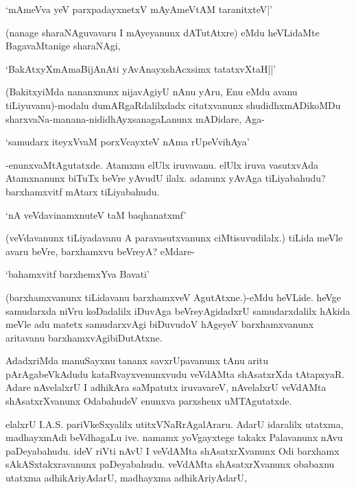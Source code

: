 \begin{shloka}
`mAmeVva yeV parxpadayxnetxV mAyAmeVtAM taranitxteV|'
\end{shloka}

(nanage sharaNAguvavaru I mAyeyanunx dATutAtxre) eMdu heVLidaMte BagavaMtanige sharaNAgi,

\begin{shloka}
`BakAtxyXmAmaBijAnAti yAvAnayxshAcxsimx tatatxvXtaH||'
\end{shloka}

(BakitxyiMda nananxnunx nijavAgiyU nAnu yAru, Enu eMdu avanu tiLiyuvanu)-modalu dumARgaRdalilxdadx citatxvanunx shudidhxmADikoMDu sharxvaNa-manana-nididhAyxsanagaLanunx mADidare, Aga-

\begin{shloka}
`samudarx iteyxVvaM porxVcayxteV nAma rUpeVvihAya'
\end{shloka}

-enunxvaMtAgutatxde. Atamxnu elUlx iruvavanu. elUlx iruva vasutxvAda Atamxnanunx biTuTx beVre yAvudU ilalx. adanunx yAvAga tiLiyabahudu? barxhamxvitf mAtarx tiLiyabahudu.

\begin{shloka}
`nA veVdavinamxnuteV taM baqhanatxmf'
\end{shloka}

(veVdavanunx tiLiyadavanu A paravasutxvanunx ciMtisuvudilalx.) tiLida meVle avaru beVre, barxhamxvu beVreyA? eMdare-

\begin{shloka}
`bahamxvitf barxhemxYva Bavati'
\end{shloka}

(barxhamxvanunx tiLidavanu barxhamxveV AgutAtxne.)-eMdu heVLide. heVge samudarxda niVru koDadalilx iDuvAga beVreyAgidadxrU samudarxdalilx hAkida meVle adu matetx samudarxvAgi biDuvudoV hAgeyeV barxhamxvanunx aritavanu barxhamxvAgibiDutAtxne.

AdadxriMda manuSayxnu tananx savxrUpavanunx tAnu aritu pArAgabeVkAdudu kataRvayxvenunxvudu veVdAMta shAsatxrXda tAtapxyaR. Adare nAvelalxrU I adhikAra saMpatutx iruvavareV, nAvelalxrU veVdAMta shAsatxrXvanunx OdabahudeV enunxva parxshenx uMTAgutatxde.

elalxrU {\eng I.A.S.} pariVkeSxyalilx utitxVNaRrAgalAraru. AdarU idaralilx utatxma, madhayxmAdi beVdhagaLu ive. namamx yoVgayxtege takakx Palavanunx nAvu paDeyabahudu. ideV riVti nAvU I veVdAMta shAsatxrXvanunx Odi barxhamx sAkASxtakxravanunx paDeyabahudu. veVdAMta shAsatxrXvanunx obabaxnu utatxma adhikAriyAdarU, madhayxma adhikAriyAdarU,

